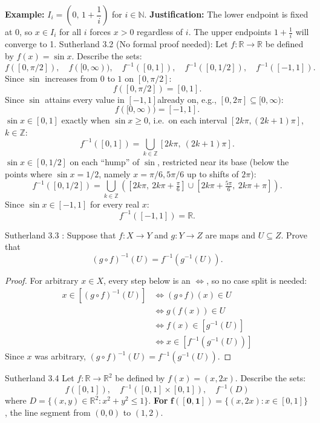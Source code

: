 \documentclass{homework}
\newcommand{\Reals}{\ensuremath{\mathbb R}}%
\newcommand{\Nats}{\ensuremath{\mathbb N}} %
\newcommand{\Ints}{\ensuremath{\mathbb Z}} %
\begin{document}
\begin{problems}
\subsol
  \textbf{Example:} $I_i = \left(0,\, 1+\dfrac1i\right)$ for $i \in \Nats$. \newline
  \textbf{Justification:} The lower endpoint is fixed at $0$, so $x \in I_i$ for all $i$ forces $x > 0$ regardless of $i$. The upper endpoints $1+\frac1i$ will converge to 1.
\problem Sutherland 3.2 (No formal proof needed):
Let $f : \Reals \to \Reals$ be defined by $f(x) = \sin x$. Describe the sets:
\[
f([0, \pi/2]), \quad f([0,\infty)), \quad f^{-1}([0,1]), \quad f^{-1}([0,1/2]), \quad f^{-1}([-1,1]).
\]
\solution
$ $\newline Since $\sin$ increases from $0$ to $1$ on $[0,\pi/2]$:
\[
f([0,\pi/2]) = [0,1].
\]
Since $\sin$ attains every value in $[-1,1]$already on, e.g., $[0,2\pi] \subseteq [0,\infty)$:
\[
f([0,\infty)) = [-1,1].
\]
$\sin x \in [0,1]$ exactly when $\sin x \ge 0$, i.e.\ on each interval $[2k\pi, (2k+1)\pi]$, $k \in \Ints$:
\[
f^{-1}([0,1]) = \bigcup_{k \in \Ints} [2k\pi,\ (2k+1)\pi].
\]
$\sin x \in [0,1/2]$ on each ``hump'' of $\sin$, restricted near its base (below the points where $\sin x = 1/2$, namely $x = \pi/6, 5\pi/6$ up to shifts of $2\pi$):
\[
f^{-1}([0,1/2]) = \bigcup_{k \in \Ints} \left( \left[2k\pi,\ 2k\pi+\tfrac{\pi}{6}\right] \cup \left[2k\pi+\tfrac{5\pi}{6},\ 2k\pi+\pi\right] \right).
\]
Since $\sin x \in [-1,1]$ for every real $x$:
\[
f^{-1}([-1,1]) = \Reals.
\]

\problem Sutherland 3.3 :
Suppose that $f : X \to Y$ and $g : Y \to Z$ are maps and $U \subseteq Z$.
Prove that
\[
(g \circ f)^{-1}(U) = f^{-1}(g^{-1}(U)).
\]
\solution
  \begin{proof}
$ $\newline For arbitrary $x \in X$, every step below is an $\iff$, so no case split is needed:
    \begin{align*}
      x \in [(g\circ f)^{-1}(U)] &\iff (g \circ f)(x) \in U \\
      &\iff g(f(x)) \in U \\
      &\iff f(x) \in [g^{-1}(U)] \\
      &\iff x \in [f^{-1}(g^{-1}(U))]
    \end{align*}
    Since $x$ was arbitrary, $(g\circ f)^{-1}(U) = f^{-1}(g^{-1}(U))$.
\end{proof}

\problem Sutherland 3.4
Let $f : \Reals \to \Reals^2$ be defined by $f(x) = (x, 2x)$. Describe the sets:
\[
f([0,1]), \quad f^{-1}([0,1] \times [0,1]), \quad f^{-1}(D)
\]
where $D = \{(x,y) \in \Reals^2 : x^2 + y^2 \le 1\}$.
\solution
$ $\newline \textbf{For} $\mathbf{f([0,1])} = \{(x,2x) : x \in [0,1]\}$, the line segment from $(0,0)$ to $(1,2)$.


\end{problems}
\end{document}
